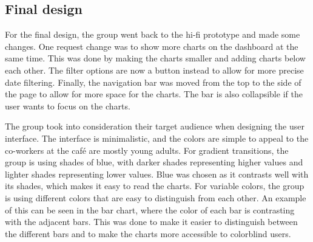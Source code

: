 \subsection{Final design}\label{subsec:final-design}

For the final design, the group went back to the hi-fi prototype and made some changes.
One request change was to show more charts on the dashboard at the same time.
This was done by making the charts smaller and adding charts below each other.
The filter options are now a button instead to allow for more precise date filtering.
Finally, the navigation bar was moved from the top to the side of the page to allow for more space for the charts.
The bar is also collapsible if the user wants to focus on the charts.

The group took into consideration their target audience when designing the user interface.
The interface is minimalistic, and the colors are simple to appeal to the co-workers at the café are mostly young adults.
For gradient transitions, the group is using shades of blue, with darker shades representing higher values and lighter
shades representing lower values.
Blue was chosen as it contrasts well with its shades, which makes it easy to read the charts.
For variable colors, the group is using different colors that are easy to distinguish from each other.
An example of this can be seen in the bar chart, where the color of each bar is contrasting with the adjacent bars.
This was done to make it easier to distinguish between the different bars and to make the charts more accessible to
colorblind users.

